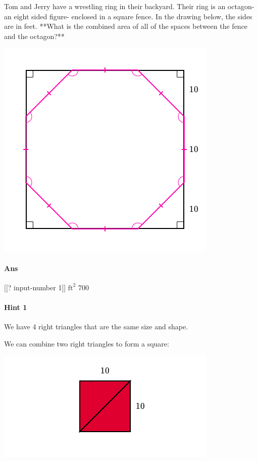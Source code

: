 \documentclass[twocolumn,10pt]{article}
\def\shrinkfactor{0.55}
\begin{document}
\noindent
Tom and Jerry have a wrestling ring in their backyard.  Their ring is an octagon- an eight sided figure- enclosed in a square fence.  In the drawing below, the sides are in feet.  **What is the combined area of all of the spaces between the fence and the octagon?**


\includegraphics[scale=\shrinkfactor]{figures/dbc27f28399165541bacc602846575cddbd21659.png}

\paragraph{Ans}  [[? input-number 1]] $\text{ft}^2$  700

\paragraph{Hint 1}We have 4 right triangles that are the same size and shape.  

We can combine two right triangles to form a square: 


\includegraphics[scale=\shrinkfactor]{figures/7b202092b90108ba9707f033da2930445cb57204.png}      
\end{document}
